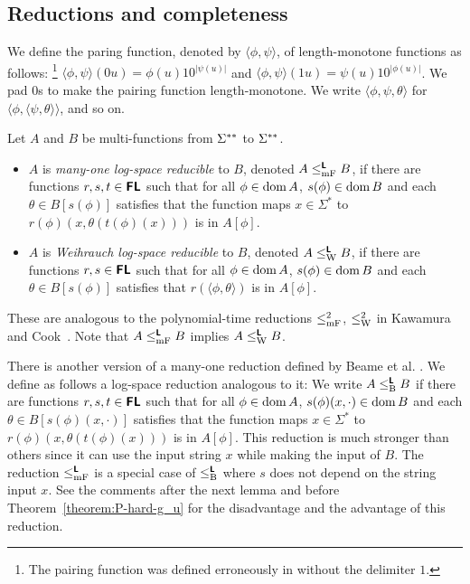\documentclass[envcountsame,orivec,oribibl]{llncs}
\begin{document}
\subsection{Reductions and completeness}

We define the paring function, denoted by $\langle \phi, \psi \rangle$,
of length-monotone functions as follows:%
\footnote{%
The pairing function was
defined erroneously in \cite{kawamura2012complexity} 
without the delimiter $1$. 
}
$\langle \phi, \psi \rangle(0u) = \phi(u) 10^{|\psi(u)|}$ and 
$\langle \phi, \psi \rangle(1u) = \psi(u) 10^{|\phi(u)|}$.
We pad $0$s to make the pairing function length-monotone.
We write $\langle \phi, \psi, \theta \rangle$ 
for $\langle \phi, \langle \psi, \theta \rangle \rangle$, and so on.

\begin{definition}
Let $A$ and $B$ be multi-functions from $\Sigma ^{**}$ to $\Sigma ^{**}$.
\begin{itemize}
 \item $A$ is \emph{many-one log-space reducible} to $B$, 
       denoted $A \leq _{\mathrm{mF}} ^{\text{\bfseries \sffamily \upshape L}} B$,
       if there are functions $r, s, t \in \text{\bfseries \sffamily \upshape FL}$ such that 
       for all $\phi \in \mathop{\rm dom} A$,
       $s(\phi) \in \mathop{\rm dom} B$ and each $\theta \in B[s(\phi)]$ satisfies that
       the function maps $x \in \Sigma^*$ to $r(\phi)(x, \theta(t(\phi)(x)))$
       is in $A[\phi]$.
 \item $A$ is \emph{Weihrauch log-space reducible} to $B$,
       denoted $A \leq _{\mathrm W} ^{\text{\bfseries \sffamily \upshape L}} B$,
       if there are functions $r, s \in \text{\bfseries \sffamily \upshape FL}$ such that 
       for all $\phi \in \mathop{\rm dom} A$,
       $s(\phi) \in \mathop{\rm dom} B$ and each $\theta \in B[s(\phi)]$ satisfies that
       $r(\langle \phi, \theta \rangle)$ is in $A[\phi]$.
\end{itemize}
\end{definition}

These are analogous to the polynomial-time reductions 
$\leq _{\mathrm{mF}}^2$, $\leq _{\mathrm W}^2$ in Kawamura and Cook~\cite{kawamura2012complexity}.
Note that $A \leq _{\mathrm{mF}} ^{\text{\bfseries \sffamily \upshape L}} B$ implies $A \leq _{\mathrm W} ^{\text{\bfseries \sffamily \upshape L}} B$.

There is another version of a many-one reduction defined by
Beame et al. \cite{beame1995relative}.
We define as follows a log-space reduction analogous to it:
We write $A \leq _{\mathrm B} ^{\text{\bfseries \sffamily \upshape L}} B$ 
if there are functions $r, s, t \in \text{\bfseries \sffamily \upshape FL}$ such that 
for all $\phi \in \mathop{\rm dom} A$,
$s(\phi)(x, \cdot) \in \mathop{\rm dom} B$ and each $\theta \in B[s(\phi)(x, \cdot)]$ 
satisfies that the function maps $x \in \Sigma^*$ 
to $r(\phi)(x, \theta(t(\phi)(x)))$ is in $A[\phi]$.
This reduction is much stronger than others since
it can use the input string $x$ while making the input of $B$.
The reduction $\leq _{\mathrm{mF}} ^{\text{\bfseries \sffamily \upshape L}}$ is a special case of $\leq _{\mathrm B} ^{\text{\bfseries \sffamily \upshape L}}$ where
$s$ does not depend on the string input $x$.
See the comments after the next lemma and before Theorem~\ref{theorem:P-hard-g_u} for
the disadvantage and the advantage of this reduction.
\end{document}
